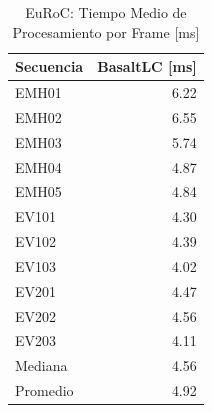 \begin{table}[!htbp]
\centering
\caption{EuRoC: Tiempo Medio de Procesamiento por Frame [ms]}
\label{tab:euroc_mean_frame_time}
\begin{tabular}{lr}
\toprule
\textbf{Secuencia} & \textbf{BasaltLC} [ms] \\
\midrule
EMH01 & 6.22 \\
EMH02 & 6.55 \\
EMH03 & 5.74 \\
EMH04 & 4.87 \\
EMH05 & 4.84 \\
\midrule
EV101 & 4.30 \\
EV102 & 4.39 \\
EV103 & 4.02 \\
\midrule
EV201 & 4.47 \\
EV202 & 4.56 \\
EV203 & 4.11 \\
\midrule
Mediana & 4.56 \\
Promedio   & 4.92 \\
\bottomrule
\end{tabular}
\end{table}

